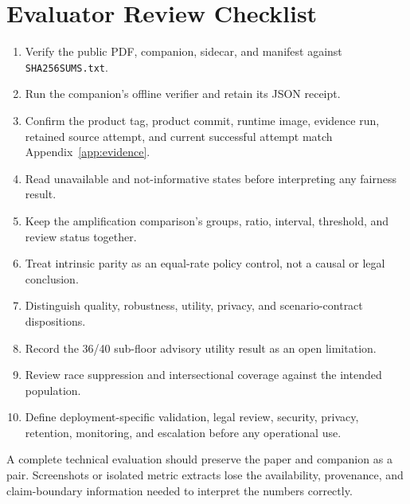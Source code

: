\section{Evaluator Review Checklist}
\label{app:review-checklist}

\begin{enumerate}
  \item Verify the public PDF, companion, sidecar, and manifest against
    \texttt{SHA256SUMS.txt}.
  \item Run the companion's offline verifier and retain its JSON receipt.
  \item Confirm the product tag, product commit, runtime image, evidence run, retained source
    attempt, and current successful attempt match Appendix~\ref{app:evidence}.
  \item Read unavailable and not-informative states before interpreting any fairness result.
  \item Keep the amplification comparison's groups, ratio, interval, threshold, and review status
    together.
  \item Treat intrinsic parity as an equal-rate policy control, not a causal or legal conclusion.
  \item Distinguish quality, robustness, utility, privacy, and scenario-contract dispositions.
  \item Record the 36/40 sub-floor advisory utility result as an open limitation.
  \item Review race suppression and intersectional coverage against the intended population.
  \item Define deployment-specific validation, legal review, security, privacy, retention,
    monitoring, and escalation before any operational use.
\end{enumerate}

A complete technical evaluation should preserve the paper and companion as a pair. Screenshots or
isolated metric extracts lose the availability, provenance, and claim-boundary information needed
to interpret the numbers correctly.
